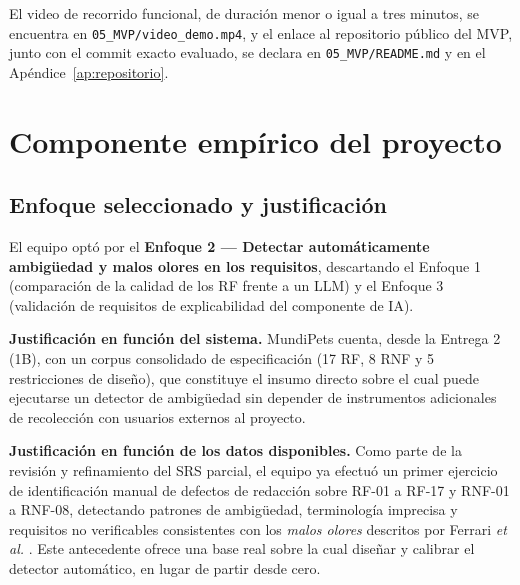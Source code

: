 \documentclass[journal,onecolumn]{IEEEtran}
\begin{document}
	El video de recorrido funcional, de duración menor o igual a tres minutos,
	se encuentra en \texttt{05\_MVP/video\_demo.mp4}, y el enlace al repositorio
	público del MVP, junto con el commit exacto evaluado, se declara en
	\texttt{05\_MVP/README.md} y en el Apéndice~\ref{ap:repositorio}.
	
	\section{Componente empírico del proyecto}
	\label{sec:empirico}
	
	\subsection{Enfoque seleccionado y justificación}
	\label{sec:enfoque}
	
	El equipo optó por el \textbf{Enfoque 2 --- Detectar automáticamente
		ambigüedad y malos olores en los requisitos}, descartando el Enfoque 1
	(comparación de la calidad de los RF frente a un LLM) y el Enfoque 3
	(validación de requisitos de explicabilidad del componente de IA).
	
	\textbf{Justificación en función del sistema.} MundiPets cuenta, desde la
	Entrega 2 (1B), con un corpus consolidado de especificación (17 RF, 8 RNF y
	5 restricciones de diseño), que constituye el insumo directo sobre el cual
	puede ejecutarse un detector de ambigüedad sin depender de instrumentos
	adicionales de recolección con usuarios externos al proyecto.
	
	\textbf{Justificación en función de los datos disponibles.} Como parte de la
	revisión y refinamiento del SRS parcial, el equipo ya efectuó un primer
	ejercicio de identificación manual de defectos de redacción sobre RF-01 a
	RF-17 y RNF-01 a RNF-08, detectando patrones de ambigüedad, terminología
	imprecisa y requisitos no verificables consistentes con los \emph{malos
		olores} descritos por Ferrari \emph{et al.} \cite{ferrari2016}. Este
	antecedente ofrece una base real sobre la cual diseñar y calibrar el
	detector automático, en lugar de partir desde cero.
	
\end{document}
